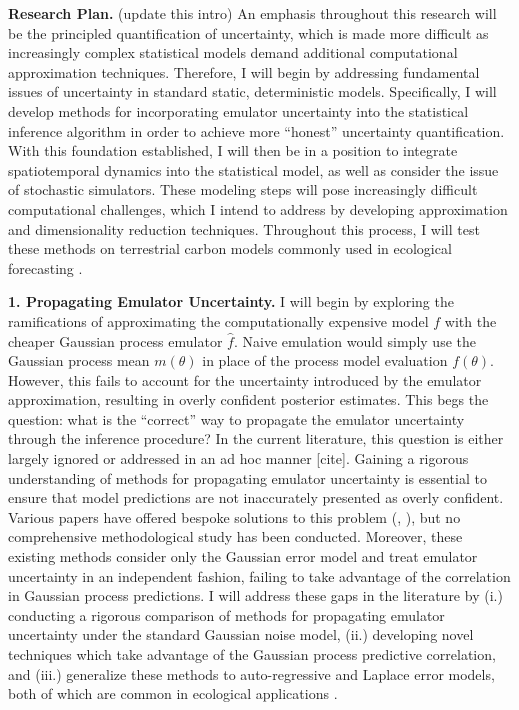 \documentclass[12pt]{article}
\begin{document}
\noindent
\textbf{Research Plan.} (update this intro) An emphasis throughout this research will be the principled quantification of uncertainty, which is made more difficult
as increasingly complex statistical models demand additional computational approximation techniques. Therefore, I will begin by addressing fundamental issues of uncertainty in standard static, deterministic models. Specifically, I will develop methods for incorporating emulator uncertainty into the statistical inference algorithm in order to achieve more ``honest'' uncertainty quantification. With this foundation established, I will then be in a position to integrate spatiotemporal dynamics into the statistical model, as well as consider the issue of stochastic simulators. These modeling steps will pose increasingly difficult computational challenges, which I intend to address by developing approximation and dimensionality reduction techniques. Throughout this process, I will test these methods on terrestrial carbon models commonly used in ecological forecasting \cite{Dietze}. 
 
 \textbf{1. Propagating Emulator Uncertainty.} I will begin by exploring the ramifications of approximating the computationally expensive model $f$ with the  cheaper Gaussian process emulator $\hat{f}$. Naive emulation would simply use the Gaussian process mean $m(\theta)$ in place of the process model evaluation $f(\theta)$. However, this fails to account
 for the uncertainty introduced by the emulator approximation, resulting in overly confident posterior estimates. This begs the question: what is the ``correct'' way to propagate the emulator uncertainty through the inference procedure? In the current literature, this question is either largely ignored or addressed in an ad hoc manner [cite]. Gaining a rigorous understanding of methods for propagating emulator uncertainty is essential to ensure that model predictions are not inaccurately presented as overly confident. Various papers have offered bespoke solutions to this problem (\cite{Cleary}, \cite{Fer}), but no comprehensive
methodological study has been conducted. Moreover, these existing methods consider only the Gaussian error model and treat emulator uncertainty in an independent fashion, failing to take advantage of the correlation in Gaussian process predictions. I will address these gaps in the literature by (i.) conducting a rigorous comparison of methods for propagating emulator uncertainty under the standard Gaussian noise model, (ii.) developing novel techniques which take advantage of the Gaussian process predictive correlation, and (iii.) generalize these methods to auto-regressive and Laplace error models, both of which 
are common in ecological applications \cite{Fer}. 
\end{document}
